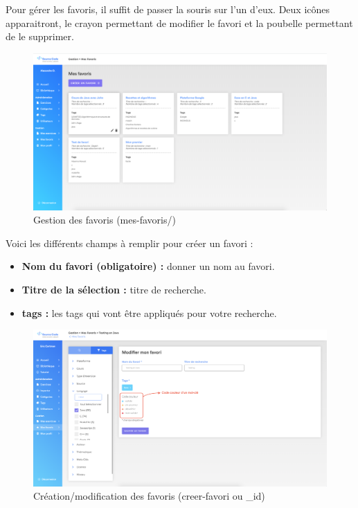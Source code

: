 Pour gérer les favoris, il suffit de passer la souris sur l'un d'eux. Deux icônes apparaitront, le crayon permettant de modifier le favori et la poubelle permettant de le supprimer.

\begin{figure}[H]
    \includegraphics[width=\textwidth,height=\textheight,keepaspectratio]{images/client/gestion-favorite.png}
    \caption[SourceCode : gestion des favoris]{Gestion des favoris (mes-favoris/)}
\end{figure}


Voici les différents champs à remplir pour créer un favori :

\begin{itemize}
    \item \textbf{Nom du favori (obligatoire) :} donner un nom au favori.
    \item \textbf{Titre de la sélection :} titre de recherche.
    \item \textbf{\Glspl{tag} :} les tags qui vont être appliqués pour votre recherche.
\end{itemize}

\begin{figure}[H]
    \includegraphics[width=\textwidth,height=\textheight,keepaspectratio]{images/client/favorite-form.png}
    \caption[SourceCode : création/modification des favoris]{Création/modification des favoris (creer-favori ou \_id)}
    \centering
\end{figure}


